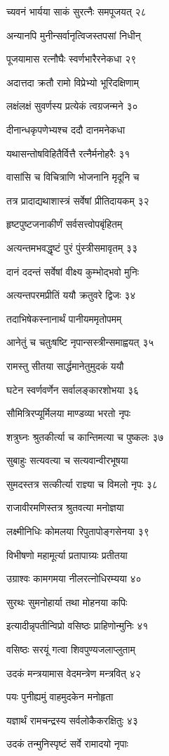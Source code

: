 च्यवनं भार्यया साकं सुरत्नैः समपूजयत् २८

अन्यानपि मुनीन्सर्वानृत्विजस्तपसां निधीन्

पूजयामास रत्नौघैः स्वर्णभारैरनेकधा २९

अदात्तदा क्रतौ रामो विप्रेभ्यो भूरिदक्षिणाम्

लक्षंलक्षं सुवर्णस्य प्रत्येकं त्वग्रजन्मने ३०

दीनान्धकृपणेभ्यश्च ददौ दानमनेकधा

यथासन्तोषविहितैर्वित्तै रत्नैर्मनोहरैः ३१

वासांसि च विचित्राणि भोजनानि मृदूनि च

तत्र प्रादाद्यथाशास्त्रं सर्वेषां प्रीतिदायकम् ३२

हृष्टपुष्टजनाकीर्णं सर्वसत्त्वोपबृंहितम्

अत्यन्तमभवद्धृष्टं पुरं पुंस्त्रीसमावृतम् ३३

दानं ददन्तं सर्वेषां वीक्ष्य कुम्भोद्भवो मुनिः

अत्यन्तपरमप्रीतिं ययौ क्रतुवरे द्विजः ३४

तदाभिषेकस्नानार्थं पानीयममृतोपमम्

आनेतुं च चतुःषष्टि नृपान्सस्त्रीन्समाह्वयत् ३५

रामस्तु सीतया सार्द्धमानेतुमुदकं ययौ

घटेन स्वर्णवर्णेन सर्वालङ्कारशोभया ३६

सौमित्रिरप्यूर्मिलया माण्डव्या भरतो नृपः

शत्रुघ्नः श्रुतकीर्त्या च कान्तिमत्या च पुष्कलः ३७

सुबाहुः सत्यवत्या च सत्यवान्वीरभूषया

सुमदस्तत्र सत्कीर्त्या राज्ञ्या च विमलो नृपः ३८

राजावीरमणिस्तत्र श्रुतवत्या मनोज्ञया

लक्ष्मीनिधिः कोमलया रिपुतापोङ्गसेनया ३९

विभीषणो महामूर्त्या प्रतापाग्र्यः प्रतीतया

उग्राश्वः कामगमया नीलरत्नोधिरम्यया ४०

सुरथः सुमनोहार्या तथा मोहनया कपिः

इत्यादीन्नृपतीन्विप्रो वसिष्ठः प्राहिणोन्मुनिः ४१

वसिष्ठः सरयूं गत्वा शिवपुण्यजलाप्लुताम्

उदकं मन्त्रयामास वेदमन्त्रेण मन्त्रवित् ४२

पयः पुनीह्यमुं वाहमुदकेन मनोहृता

यज्ञार्थं रामचन्द्रस्य सर्वलोकैकरक्षितुः ४३

उदकं तन्मुनिस्पृष्टं सर्वे रामादयो नृपाः

